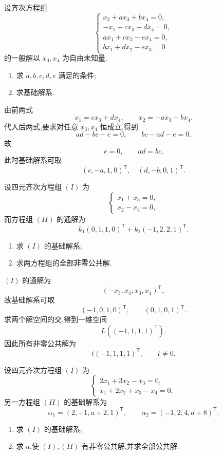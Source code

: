 \begin{example}
设齐次方程组
\[
\begin{cases}
x_2+ax_3+bx_4=0,\\
-x_1+cx_3+dx_4=0,\\
ax_1+cx_2-ex_4=0,\\
bx_1+dx_2-ex_3=0
\end{cases}
\]
的一般解以 $x_3,x_4$ 为自由未知量.
\begin{enumerate}
  \item 求 $a,b,c,d,e$ 满足的条件;
  \item 求基础解系.
\end{enumerate}
\end{example}
\exampleblank

\begin{solution}
由前两式
\[
x_1=cx_3+dx_4,
\qquad
x_2=-ax_3-bx_4.
\]
代入后两式,要求对任意 $x_3,x_4$ 恒成立,得到
\[
ad-bc-e=0,
\qquad
bc-ad-e=0.
\]
故
\[
\boxed{e=0,
\qquad ad=bc}.
\]
此时基础解系可取
\[
\boxed{
(c,-a,1,0)^{\mathsf T},
\quad
(d,-b,0,1)^{\mathsf T}
}.
\]
\end{solution}

\begin{example}
设四元齐次方程组 $(I)$ 为
\[
\begin{cases}
x_1+x_3=0,\\
x_2-x_4=0,
\end{cases}
\]
而方程组 $(II)$ 的通解为
\[
k_1(0,1,1,0)^{\mathsf T}
+k_2(-1,2,2,1)^{\mathsf T}.
\]
\begin{enumerate}
  \item 求 $(I)$ 的基础解系;
  \item 求两方程组的全部非零公共解.
\end{enumerate}
\end{example}
\exampleblank

\begin{solution}
$(I)$ 的通解为
\[
(-x_3,x_4,x_3,x_4)^{\mathsf T},
\]
故基础解系可取
\[
(-1,0,1,0)^{\mathsf T},
\qquad
(0,1,0,1)^{\mathsf T}.
\]
求两个解空间的交,得到一维空间
\[
L((-1,1,1,1)^{\mathsf T}).
\]
因此所有非零公共解为
\[
\boxed{t(-1,1,1,1)^{\mathsf T},\qquad t\neq0}.
\]
\end{solution}

\begin{example}
设四元齐次方程组 $(I)$ 为
\[
\begin{cases}
2x_1+3x_2-x_3=0,\\
x_1+2x_2+x_3-x_4=0,
\end{cases}
\]
另一方程组 $(II)$ 的基础解系为
\[
\alpha_1=(2,-1,a+2,1)^{\mathsf T},
\qquad
\alpha_2=(-1,2,4,a+8)^{\mathsf T}.
\]
\begin{enumerate}
  \item 求 $(I)$ 的基础解系;
  \item 求 $a$,使 $(I),(II)$ 有非零公共解,并求全部公共解.
\end{enumerate}
\end{example}
\exampleblank

